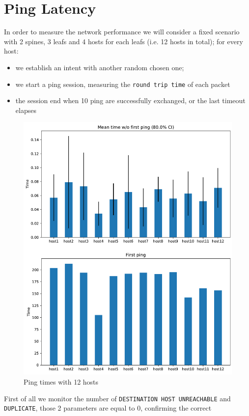 \newpage

\section{Ping Latency}
In order to measure the network performance we will consider a fixed scenario with 2 spines, 3 leafs and 4 hosts for each leafs (i.e. 12 hosts in total);
for every host:
\begin{itemize}
    \item  we establish an intent with another random chosen one;
    \item  we start a ping session, measuring the \texttt{round trip time} of each packet
    \item  the session end when 10 ping are successfully exchanged, or the last timeout elapses
\end{itemize} 
\begin{figure}[h]
    \centering
    \includegraphics[width=.92\textwidth]{img/mean_ping_time.pdf}
    \caption{Ping times with 12 hosts}
    \label{img:perf1}
\end{figure}
First of all we monitor the number of \texttt{DESTINATION HOST UNREACHABLE} and \texttt{DUPLICATE}, those 2 parameters are equal to 0, confirming the correct
